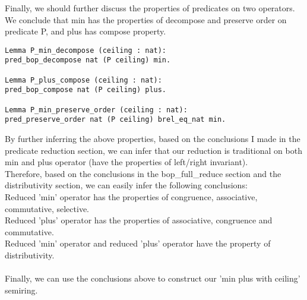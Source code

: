 \documentclass[a4paper,12pt,twoside,openright]{report}
\begin{document}
Finally, we should further discuss the properties of predicates on two operators. We conclude that min has the properties of decompose and preserve order on predicate P, and plus has compose property.
\begin{lstlisting}
Lemma P_min_decompose (ceiling : nat): 
pred_bop_decompose nat (P ceiling) min.
       
Lemma P_plus_compose (ceiling : nat): 
pred_bop_compose nat (P ceiling) plus.

Lemma P_min_preserve_order (ceiling : nat): 
pred_preserve_order nat (P ceiling) brel_eq_nat min.
\end{lstlisting}
By further inferring the above properties, based on the conclusions I made in the predicate reduction section, we can infer that our reduction is traditional on both min and plus operator (have the properties of left/right invariant).\\
Therefore, based on the conclusions in the bop\_full\_reduce section and the distributivity section, we can easily infer the following conclusions:\\
Reduced 'min' operator has the properties of congruence, associative, commutative, selective.\\
Reduced 'plus' operator has the properties of associative, congruence and commutative.\\
Reduced 'min' operator and reduced 'plus' operator have the property of distributivity.\\\\
Finally, we can use the conclusions above to construct our 'min plus with ceiling' semiring.
\end{document}
